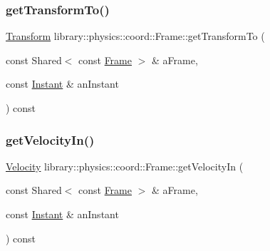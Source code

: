 \mbox{\label{classlibrary_1_1physics_1_1coord_1_1_frame_a567715e72b885f8c7ec0ab7a3d068240}} 
\subsubsection{\texorpdfstring{get\+Transform\+To()}{getTransformTo()}}
{\footnotesize\ttfamily \hyperlink{classlibrary_1_1physics_1_1coord_1_1_transform}{Transform} library\+::physics\+::coord\+::\+Frame\+::get\+Transform\+To (\begin{DoxyParamCaption}\item[{const Shared$<$ const \hyperlink{classlibrary_1_1physics_1_1coord_1_1_frame}{Frame} $>$ \&}]{a\+Frame,  }\item[{const \hyperlink{classlibrary_1_1physics_1_1time_1_1_instant}{Instant} \&}]{an\+Instant }\end{DoxyParamCaption}) const}

\mbox{\label{classlibrary_1_1physics_1_1coord_1_1_frame_ae7974e759c97f32ccc966cbcc3baf77c}} 
\subsubsection{\texorpdfstring{get\+Velocity\+In()}{getVelocityIn()}}
{\footnotesize\ttfamily \hyperlink{classlibrary_1_1physics_1_1coord_1_1_velocity}{Velocity} library\+::physics\+::coord\+::\+Frame\+::get\+Velocity\+In (\begin{DoxyParamCaption}\item[{const Shared$<$ const \hyperlink{classlibrary_1_1physics_1_1coord_1_1_frame}{Frame} $>$ \&}]{a\+Frame,  }\item[{const \hyperlink{classlibrary_1_1physics_1_1time_1_1_instant}{Instant} \&}]{an\+Instant }\end{DoxyParamCaption}) const}

\mbox{\label{classlibrary_1_1physics_1_1coord_1_1_frame_afd83dec4bf4e2aabc2b31019b282965e}} 
